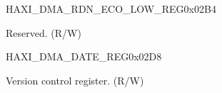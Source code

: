 \begin{register}{H}{AXI\_DMA\_RDN\_ECO\_LOW\_REG}{0x02B4}\label{regdesc:AXIDMARDNECOLOWREG}
%
\regnewline%
\begin{regdesc}\begin{reglist}
\label{fielddesc:AXIDMARDNECOLOW}\item [AXI\_DMA\_RDN\_ECO\_LOW] Reserved. (R/W)
\end{reglist}\end{regdesc}
\end{register}


\begin{register}{H}{AXI\_DMA\_DATE\_REG}{0x02D8}\label{regdesc:AXIDMADATEREG}
%
\regnewline%
\begin{regdesc}\begin{reglist}
\label{fielddesc:AXIDMADATE}\item [AXI\_DMA\_DATE] Version control register. (R/W)
\end{reglist}\end{regdesc}
\end{register}

